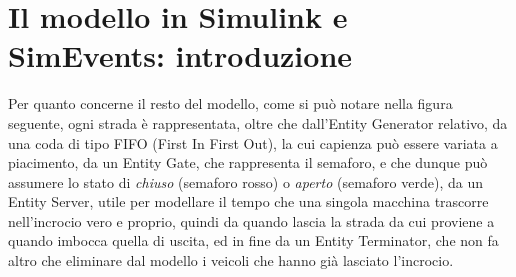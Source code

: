 \newpage
\section{Il modello in Simulink e SimEvents: introduzione}
Per quanto concerne il resto del modello, come si può notare nella figura seguente, ogni strada è rappresentata, oltre che dall’Entity Generator relativo, da una coda di tipo FIFO (First In First Out), la cui capienza può essere variata a piacimento, da un Entity Gate, che rappresenta il semaforo, e che dunque può assumere lo stato di \textit{chiuso} (semaforo rosso) o \textit{aperto} (semaforo verde), da un Entity Server, utile per modellare il tempo che una singola macchina trascorre nell’incrocio vero e proprio, quindi da quando lascia la strada da cui proviene a quando imbocca quella di uscita, ed in fine da un Entity Terminator, che non fa altro che eliminare dal modello i veicoli che hanno già lasciato l’incrocio.

